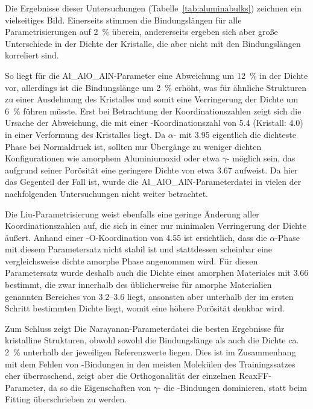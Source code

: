 Die Ergebnisse dieser Untersuchungen (Tabelle~\ref{tab:aluminabulks}) zeichnen ein vielseitiges Bild.
Einerseits stimmen die Bindungslängen für alle Parametrisierungen auf \SI{2}{\percent} überein, andererseits ergeben sich aber große Unterschiede in der Dichte der Kristalle, die aber nicht mit den Bindungslängen korreliert sind.

So liegt für die Al\_AlO\_AlN-Parameter eine Abweichung um \SI{+12}{\percent} in der Dichte vor, allerdings ist die Bindungslänge um \SI{2}{\percent} erhöht, was für ähnliche Strukturen zu einer Ausdehnung des Kristalles und somit eine Verringerung der Dichte um \SI{6}{\percent} führen müsste.
Erst bei Betrachtung der Koordinationszahlen zeigt sich die Ursache der Abweichung, die mit einer -Koordinationszahl von \num{5.4} (Kristall: \num{4.0}) in einer Verformung des Kristalles liegt.
Da $\alpha$- mit \SI{3.95}{\gpcc} eigentlich die dichteste Phase bei Normaldruck ist, sollten nur Übergänge zu weniger dichten Konfigurationen wie amorphem Aluminiumoxid oder etwa $\gamma$- möglich sein, das aufgrund seiner Porösität eine geringere Dichte von etwa \SI{3.67}{\gpcc}\cite{dynys_alpha_1982} aufweist.
Da hier das Gegenteil der Fall ist, wurde die Al\_AlO\_AlN-Parameterdatei in vielen der nachfolgenden Untersuchungen nicht weiter betrachtet.

Die Liu-Parametrisierung weist ebenfalls eine geringe Änderung aller Koordinationszahlen auf, die sich in einer nur minimalen Verringerung der Dichte äußert.
Anhand einer -{O}-Koordination von \num{4.55} ist ersichtlich, dass die $\alpha$-Phase mit diesem Parametersatz nicht stabil ist und stattdessen scheinbar eine vergleichsweise dichte amorphe Phase angenommen wird.
Für diesen Parametersatz wurde deshalb auch die Dichte eines amorphen Materiales mit \SI{3.66}{\gpcc} bestimmt, die zwar innerhalb des üblicherweise für amorphe Materialien genannten Bereiches von \SIrange{3.2}{3.6}{\gpcc} liegt, ansonsten aber unterhalb der im ersten Schritt bestimmten Dichte liegt, womit eine höhere Porösität denkbar wird.

Zum Schluss zeigt Die Narayanan-Parameterdatei die besten Ergebnisse für kristalline Strukturen, obwohl sowohl die Bindungslänge als auch die Dichte ca. \SI{2}{\percent} unterhalb der jeweiligen Referenzwerte liegen.
Dies ist im Zusammenhang mit dem Fehlen von -Bindungen in den meisten Molekülen des Trainingssatzes eher überraschend, zeigt aber die Orthogonalität der einzelnen ReaxFF-Parameter, da so die Eigenschaften von $\gamma$- die -Bindungen dominieren, statt beim Fitting überschrieben zu werden.

